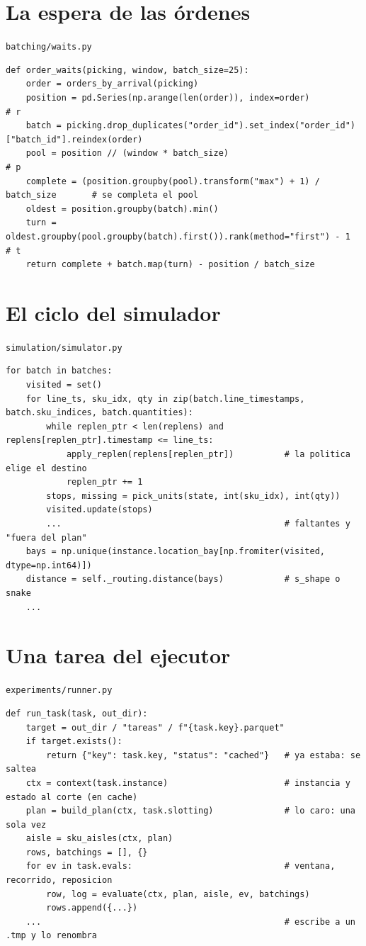 \documentclass[11pt,a4paper,oneside]{report}
\newcommand{\code}[1]{\texttt{\small #1}}
\begin{document}
\section{La espera de las órdenes}
\code{batching/waits.py}
\begin{lstlisting}
def order_waits(picking, window, batch_size=25):
    order = orders_by_arrival(picking)
    position = pd.Series(np.arange(len(order)), index=order)                    # r
    batch = picking.drop_duplicates("order_id").set_index("order_id")["batch_id"].reindex(order)
    pool = position // (window * batch_size)                                      # p
    complete = (position.groupby(pool).transform("max") + 1) / batch_size       # se completa el pool
    oldest = position.groupby(batch).min()
    turn = oldest.groupby(pool.groupby(batch).first()).rank(method="first") - 1  # t
    return complete + batch.map(turn) - position / batch_size
\end{lstlisting}

\section{El ciclo del simulador}
\code{simulation/simulator.py}
\begin{lstlisting}
for batch in batches:
    visited = set()
    for line_ts, sku_idx, qty in zip(batch.line_timestamps, batch.sku_indices, batch.quantities):
        while replen_ptr < len(replens) and replens[replen_ptr].timestamp <= line_ts:
            apply_replen(replens[replen_ptr])          # la politica elige el destino
            replen_ptr += 1
        stops, missing = pick_units(state, int(sku_idx), int(qty))
        visited.update(stops)
        ...                                            # faltantes y "fuera del plan"
    bays = np.unique(instance.location_bay[np.fromiter(visited, dtype=np.int64)])
    distance = self._routing.distance(bays)            # s_shape o snake
    ...
\end{lstlisting}

\section{Una tarea del ejecutor}
\code{experiments/runner.py}
\begin{lstlisting}
def run_task(task, out_dir):
    target = out_dir / "tareas" / f"{task.key}.parquet"
    if target.exists():
        return {"key": task.key, "status": "cached"}   # ya estaba: se saltea
    ctx = context(task.instance)                       # instancia y estado al corte (en cache)
    plan = build_plan(ctx, task.slotting)              # lo caro: una sola vez
    aisle = sku_aisles(ctx, plan)
    rows, batchings = [], {}
    for ev in task.evals:                              # ventana, recorrido, reposicion
        row, log = evaluate(ctx, plan, aisle, ev, batchings)
        rows.append({...})
    ...                                                # escribe a un .tmp y lo renombra
\end{lstlisting}
\end{document}
